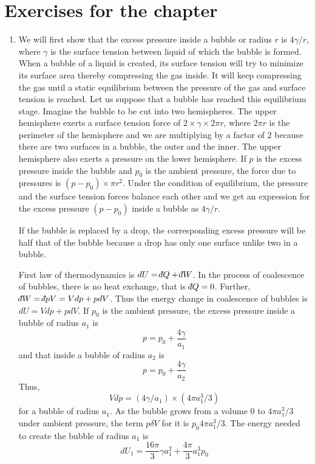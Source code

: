 \section{Exercises for the chapter}\label{c1s8}
\begin{enumerate}
\item We will first show that the excess pressure inside a bubble or radius $r$ is $4\gamma/r$, where $\gamma$ is the surface tension between liquid of which the bubble is formed. When a 
bubble of a liquid is created, its surface tension will try to minimize its surface area thereby compressing the gas inside. It will keep compressing the gas until a static equilibrium
between the pressure of the gas and surface tension is reached. Let us suppose that a bubble has reached this equilibrium stage. Imagine the bubble to be cut into two hemispheres. The 
upper hemisphere exerts a surface tension force of $2\times\gamma\times 2\pi r$, where $2\pi r$ is the perimeter of the hemisphere and we are multiplying by a factor of $2$ because there 
are two surfaces in a bubble, the outer and the inner. The upper hemisphere also exerts a pressure on the lower hemisphere. If $p$ is the excess pressure inside the bubble and $p_0$ is 
the ambient pressure, the force due to pressures is $(p-p_0)\times\pi r^2$. Under the condition of equilibrium, the pressure and the surface tension forces balance each other and we get 
an expression for the excess pressure $(p-p_0)$ inside a bubble as $4\gamma/r$.
\begin{rem}
If the bubble is replaced by a drop, the corresponding excess pressure will be half that of the bubble because a drop has only one surface unlike two in a bubble.
\end{rem}
First law of thermodynamics is $dU = \dbar{Q} + \dbar{W}$. In the process of coalescence of bubbles, there is no heat exchange, that is $\dbar{Q} = 0$. Further, $\dbar{W} = \dbar{pV} = 
Vdp + pdV$. Thus the energy change in coalescence of bubbles is $dU = Vdp + pdV$. If $p_0$ is the ambient pressure, the excess pressure inside a bubble of radius $a_1$ is 
\[
p = p_0 + \frac{4\gamma}{a_1}
\]
and that inside a bubble of radius $a_2$ is
\[
p = p_0 + \frac{4\gamma}{a_2}
\]
Thus, 
\[
Vdp = (4\gamma/a_1) \times (4\pi a_1^3/3)
\]
for a bubble of radius $a_1$. As the bubble grows from a volume $0$ to  $4\pi a_1^3/3$ under ambient pressure, the term $p\delta{V}$ for it is $p_0 4\pi a_1^3/3$. The energy needed to 
create the bubble of radius $a_1$ is
\begin{equation}\label{c1s8e1}
dU_1 = \frac{16\pi}{3}\gamma a_1^2 + \frac{4\pi}{3} a_1^3p_0

\end{equation}
\end{enumerate}
